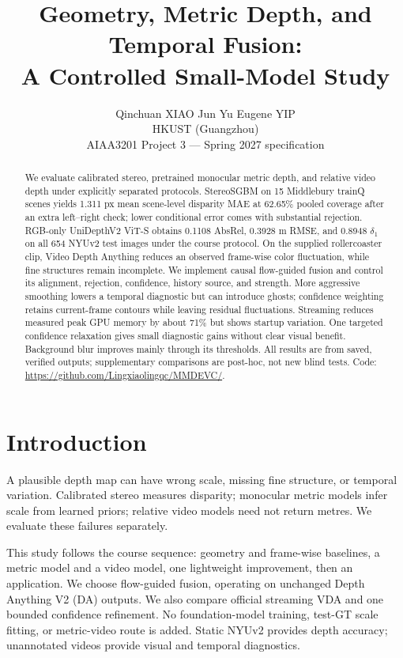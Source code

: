 \documentclass[10pt,twocolumn,letterpaper]{article}
\title{Geometry, Metric Depth, and Temporal Fusion:\\A Controlled Small-Model Study}
\author{Qinchuan XIAO \qquad Jun Yu Eugene YIP\\
HKUST (Guangzhou)\\
AIAA3201 Project 3 --- Spring 2027 specification}
\begin{document}
\maketitle
\begin{abstract}
We evaluate calibrated stereo, pretrained monocular metric depth, and relative video depth under explicitly separated protocols. StereoSGBM on 15 Middlebury trainQ scenes yields 1.311 px mean scene-level disparity MAE at 62.65\% pooled coverage after an extra left--right check; lower conditional error comes with substantial rejection. RGB-only UniDepthV2 ViT-S obtains 0.1108 AbsRel, 0.3928 m RMSE, and 0.8948 $\delta_1$ on all 654 NYUv2 test images under the course protocol. On the supplied rollercoaster clip, Video Depth Anything reduces an observed frame-wise color fluctuation, while fine structures remain incomplete. We implement causal flow-guided fusion and control its alignment, rejection, confidence, history source, and strength. More aggressive smoothing lowers a temporal diagnostic but can introduce ghosts; confidence weighting retains current-frame contours while leaving residual fluctuations. Streaming reduces measured peak GPU memory by about 71\% but shows startup variation. One targeted confidence relaxation gives small diagnostic gains without clear visual benefit. Background blur improves mainly through its thresholds. All results are from saved, verified outputs; supplementary comparisons are post-hoc, not new blind tests. Code: \url{https://github.com/Lingxiaolingqc/MMDEVC/}.
\end{abstract}

\section{Introduction}
A plausible depth map can have wrong scale, missing fine structure, or temporal variation. Calibrated stereo measures disparity; monocular metric models infer scale from learned priors; relative video models need not return metres. We evaluate these failures separately.

This study follows the course sequence: geometry and frame-wise baselines, a metric model and a video model, one lightweight improvement, then an application. We choose flow-guided fusion, operating on unchanged Depth Anything V2 (DA) outputs. We also compare official streaming VDA and one bounded confidence refinement. No foundation-model training, test-GT scale fitting, or metric-video route is added. Static NYUv2 provides depth accuracy; unannotated videos provide visual and temporal diagnostics.
\end{document}

